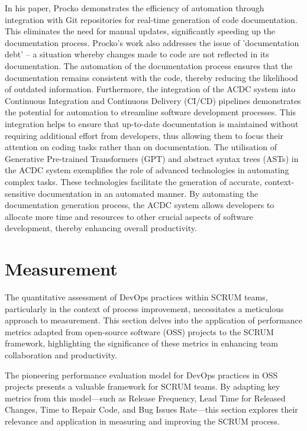 In his paper, Procko \cite{Procko2024CodeDocumentation} demonstrates the efficiency of automation through integration with Git repositories for real-time generation of code documentation. This eliminates the need for manual updates, significantly speeding up the documentation process. Procko's work also addresses the issue of 'documentation debt' – a situation whereby changes made to code are not reflected in its documentation. The automation of the documentation process ensures that the documentation remains consistent with the code, thereby reducing the likelihood of outdated information. Furthermore, the integration of the ACDC system into Continuous Integration and Continuous Delivery (CI/CD) pipelines demonstrates the potential for automation to streamline software development processes. This integration helps to ensure that up-to-date documentation is maintained without requiring additional effort from developers, thus allowing them to focus their attention on coding tasks rather than on documentation. The utilisation of Generative Pre-trained Transformers (GPT) and abstract syntax trees (ASTs) in the ACDC system exemplifies the role of advanced technologies in automating complex tasks. These technologies facilitate the generation of accurate, context-sensitive documentation in an automated manner. By automating the documentation generation process, the ACDC system allows developers to allocate more time and resources to other crucial aspects of software development, thereby enhancing overall productivity.
 

\section{Measurement}

The quantitative assessment of DevOps practices within SCRUM teams, particularly in the context of process improvement, necessitates a meticulous approach to measurement. This section delves into the application of performance metrics adapted from open-source software (OSS) projects to the SCRUM framework, highlighting the significance of these metrics in enhancing team collaboration and productivity.

The pioneering performance evaluation model for DevOps practices in OSS projects presents a valuable framework for SCRUM teams. By adapting key metrics from this model—such as Release Frequency, Lead Time for Released Changes, Time to Repair Code, and Bug Issues Rate—this section explores their relevance and application in measuring and improving the SCRUM process.\cite{PerformanceEvalOSS2023}

